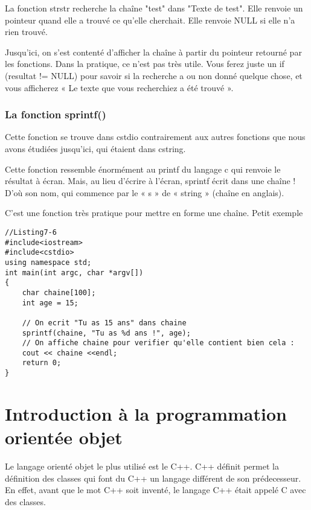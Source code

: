 \documentclass[a4paper, oneside,11pt]{book}
\begin{document}
La fonction strstr recherche la cha\^ine "test" dans "Texte de test". Elle renvoie un pointeur quand elle a trouv\'e ce qu'elle cherchait. Elle renvoie NULL si elle n'a rien trouv\'e.

Jusqu'ici, on s'est content\'e d'afficher la cha\^ine \`a partir du pointeur retourn\'e par les fonctions. Dans la pratique, ce n'est pas tr\`es utile. Vous ferez juste un if 
(resultat != NULL) pour savoir si la recherche a ou non donn\'e quelque chose, et vous afficherez « Le texte que vous recherchiez a \'et\'e trouv\'e ».

\subsection{La fonction sprintf()}

Cette fonction se trouve dans cstdio contrairement aux autres fonctions que nous avons \'etudi\'ees jusqu'ici, qui \'etaient dans cstring.


Cette fonction ressemble \'enorm\'ement au printf du langage c qui renvoie le
r\'esultat \`a \'ecran. Mais, au lieu d'\'ecrire \`a l'\'ecran, sprintf \'ecrit 
dans une cha\^ine ! D'où son nom, qui commence par le « s » de « string » 
(cha\^ine en anglais).

C'est une fonction tr\`es pratique pour mettre en forme une cha\^ine. Petit exemple 


\begin{lstlisting}
//Listing7-6
#include<iostream>
#include<cstdio>
using namespace std;
int main(int argc, char *argv[])
{
    char chaine[100];
    int age = 15;

    // On ecrit "Tu as 15 ans" dans chaine
    sprintf(chaine, "Tu as %d ans !", age);
    // On affiche chaine pour verifier qu'elle contient bien cela :
    cout << chaine <<endl;
    return 0;
}

\end{lstlisting}

\chapter{Introduction \`a la programmation orient\'ee objet}
\pagestyle{fancy}
\renewcommand{\chaptermark}[1]{\markboth{#1}{}}
 \rhead{\thepage}

Le langage orient\'e objet le plus utilis\'e est le C++. C++ d\'efinit permet 
la d\'efinition des classes qui font du C++ un langage diff\'erent de 
son pr\'edecesseur. En effet, avant que le mot C++ soit invent\'e, le langage 
C++ \'etait appel\'e C avec des classes. 
\end{document}
